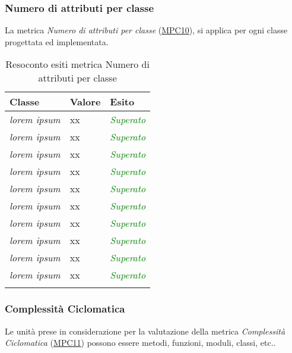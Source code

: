 \subsubsection{Numero di attributi per classe}
La metrica \textit{Numero di attributi per classe} (\hyperlink{MPC10}{MPC10}), si applica per ogni classe progettata ed implementata.

\begin{longtable}{|>{\centering\arraybackslash}p{5cm}|>{\centering\arraybackslash}p{3cm}|>{\centering\arraybackslash}p{3cm}|}
	\hline
	\rowcolor{Gray}
	\textbf{Classe} & \textbf{Valore} & \textbf{Esito} \\
	\hline
	
	\textit{lorem ipsum} & xx & \textcolor{Green}{\textit{Superato}}\\
	\hline
	\textit{lorem ipsum} & xx & \textcolor{Green}{\textit{Superato}}\\
	\hline
	\textit{lorem ipsum} & xx & \textcolor{Green}{\textit{Superato}}\\
	\hline
	\textit{lorem ipsum} & xx & \textcolor{Green}{\textit{Superato}}\\
	\hline
	\textit{lorem ipsum} & xx & \textcolor{Green}{\textit{Superato}}\\
	\hline
	\textit{lorem ipsum} & xx & \textcolor{Green}{\textit{Superato}}\\
	\hline
	\textit{lorem ipsum} & xx & \textcolor{Green}{\textit{Superato}}\\
	\hline
	\textit{lorem ipsum} & xx & \textcolor{Green}{\textit{Superato}}\\
	\hline
	\textit{lorem ipsum} & xx & \textcolor{Green}{\textit{Superato}}\\
	\hline
	\textit{lorem ipsum} & xx & \textcolor{Green}{\textit{Superato}}\\
	\hline
	
	\caption{Resoconto esiti metrica Numero di attributi per classe}
\end{longtable}

\subsubsection{Complessità Ciclomatica}
Le unità prese in considerazione per la valutazione della metrica \textit{Complessità Ciclomatica} (\hyperlink{MPC11}{MPC11}) possono essere metodi, funzioni, moduli, classi, etc..

